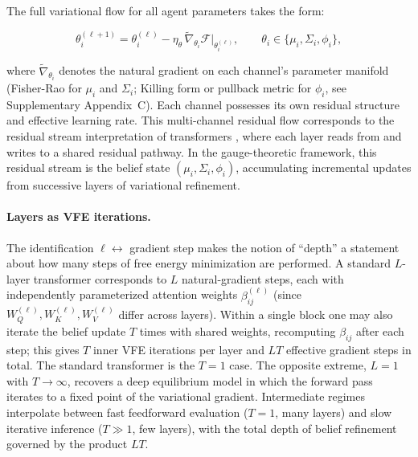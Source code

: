 \documentclass[twoside,11pt]{article}
\begin{document}
The full variational flow for all agent parameters takes the form:

\begin{equation}
\theta_i^{(\ell+1)} = \theta_i^{(\ell)} - \eta_\theta \,\tilde{\nabla}_{\theta_i}\mathcal{F}\bigg|_{\theta_i^{(\ell)}}, \qquad \theta_i \in \{\mu_i, \Sigma_i, \phi_i\},
\end{equation}

where $\tilde{\nabla}_{\theta_i}$ denotes the natural gradient on each channel's parameter manifold (Fisher-Rao for $\mu_i$ and $\Sigma_i$; Killing form or pullback metric for $\phi_i$, see Supplementary Appendix~C). Each channel possesses its own residual structure and effective learning rate. This multi-channel residual flow corresponds to the residual stream interpretation of transformers \citep{elhage2021mathematical}, where each layer reads from and writes to a shared residual pathway. In the gauge-theoretic framework, this residual stream is the belief state $(\mu_i, \Sigma_i, \phi_i)$, accumulating incremental updates from successive layers of variational refinement.

\paragraph{Layers as VFE iterations.}
The identification $\ell \leftrightarrow$ gradient step makes the notion of ``depth'' a statement about how many steps of free energy minimization are performed. A standard $L$-layer transformer corresponds to $L$ natural-gradient steps, each with independently parameterized attention weights $\beta_{ij}^{(\ell)}$ (since $W_Q^{(\ell)}, W_K^{(\ell)}, W_V^{(\ell)}$ differ across layers). Within a single block one may also iterate the belief update $T$ times with shared weights, recomputing $\beta_{ij}$ after each step; this gives $T$ inner VFE iterations per layer and $LT$ effective gradient steps in total. The standard transformer is the $T=1$ case. The opposite extreme, $L=1$ with $T\to\infty$, recovers a deep equilibrium model \citep{bai2019deep} in which the forward pass iterates to a fixed point of the variational gradient. Intermediate regimes interpolate between fast feedforward evaluation ($T=1$, many layers) and slow iterative inference ($T\gg 1$, few layers), with the total depth of belief refinement governed by the product $LT$.
\end{document}
